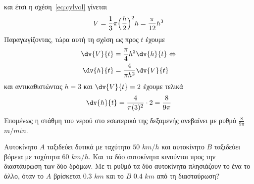 \documentclass[a4paper,table]{report}
\begin{document}
\begin{solution}
{\[      \]
      και έτσι η σχέση~\eqref{eq:cylvol} γίνεται
      \[
        V=\frac{1}{3}\pi\Bigl(\frac{h}{2}\Bigr)^{2}h = \frac{\pi}{12}h^{3}
      \]
    }
    Παραγωγίζοντας, τώρα αυτή τη σχέση ως προς $t$ έχουμε
    \begin{align}\label{eq:volrate}
      \dv{V}{t}&=\frac{\pi}{4}h^{2}\dv{h}{t}  \notag \Leftrightarrow \\
      \dv{h}{t}&=\frac{4}{\pi h^{2}}\dv{V}{t}
    \end{align}
    και αντικαθιστώντας $h=3$ και $\dv{V}{t}=2$ έχουμε τελικά
    \[
      \dv{h}{t}=\frac{4}{\pi (3)^{2}}\cdot 2 = \frac{8}{9\pi}
    \]
    Επομένως η στάθμη του νερού στο εσωτερικό της δεξαμενής ανεβαίνει με ρυθμό
    $\frac{8}{9\pi}$ $\si{m/min}$.
  \end{solution}

  \begin{mybox3}
    \begin{problem}
      Αυτοκίνητο $A$ ταξιδεύει δυτικά με ταχύτητα $50$
      $\si{km\per h}$ και αυτοκίνητο $B$ ταξιδεύει βόρεια με ταχύτητα $60$
      $\si{km/h}$. Και τα δύο αυτοκίνητα κινούνται προς την διαστάυρωση των δύο δρόμων. 
      Με τι ρυθμό τα δύο αυτοκίνητα πλησιάζουν το ένα το άλλο, όταν το $A$ βρίσκεται 
      $0.3$ $\si{km}$ και το $B$ $0.4$ $\si{km}$ από τη διασταύρωση?
    \end{problem}
  \end{mybox3}
\end{document}
